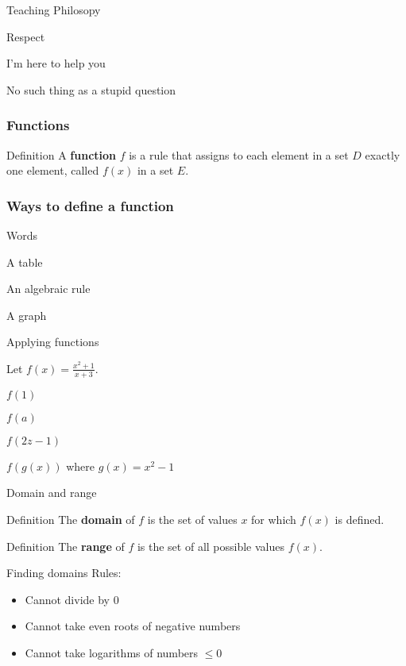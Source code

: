 \documentclass[t]{beamer}
\newenvironment{fpi}
  {\itemize[nolistsep,itemsep=\fill]}
  {\vfill\enditemize}
\begin{document}
\begin{frame}{Teaching Philosopy}
\begin{fpi}
\item Respect
\item I'm here to help you
\item No such thing as a stupid question
\end{fpi}
\end{frame}

\begin{frame}
\frametitle{Functions}
\begin{block}{Definition}
A \textbf{function} $f$ is a rule that assigns to each element in a set $D$ exactly one element, called $f(x)$
in a set $E$.
\end{block}
\end{frame}

\begin{frame}
\frametitle{Ways to define a function}
\begin{fpi}
\item Words
\item A table
\item An algebraic rule
\item A graph
\end{fpi}
\end{frame}

\begin{frame}{Applying functions}
\begin{fpi}
\item Let $\displaystyle f(x) = \frac{x^2 + 1}{x+3}$.
\item $f(1)$
\item $f(a)$
\item $f(2z -1)$
\item $f(g(x))$ where $g(x) = x^2 - 1$
\end{fpi}
\end{frame}

\begin{frame}{Domain and range}
\begin{block}{Definition}
The \textbf{domain} of $f$ is the set of values $x$ for which $f(x)$ is defined.
\end{block}
\begin{block}{Definition}
The \textbf{range} of $f$ is the set of all possible values $f(x)$.
\end{block}
\end{frame}

\begin{frame}{Finding domains}
Rules:
\begin{itemize}
\item Cannot divide by 0
\item Cannot take even roots of negative numbers  
\item Cannot take logarithms of numbers $\le 0$
\end{itemize}
\end{frame}
\end{document}
